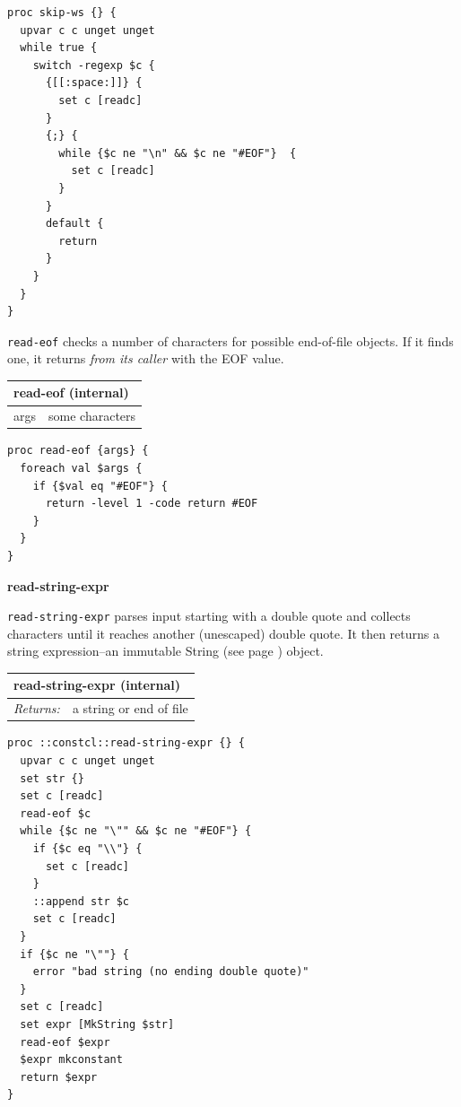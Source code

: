\documentclass[twoside,9pt]{report}
\begin{document}
\noindent\makebox[\linewidth]{\rule{\linewidth}{0.4pt}}
\begin{lstlisting}
proc skip-ws {} {
  upvar c c unget unget
  while true {
    switch -regexp $c {
      {[[:space:]]} {
        set c [readc]
      }
      {;} {
        while {$c ne "\n" && $c ne "#EOF"}  {
          set c [readc]
        }
      }
      default {
        return
      }
    }
  }
}
\end{lstlisting}
\noindent\makebox[\linewidth]{\rule{\linewidth}{0.4pt}}

\texttt{read-eof} checks a number of characters for possible end-of-file objects. If it finds one, it returns \emph{from its caller} with the EOF value.

\begin{tabular}{ |l l| }
\hline
\multicolumn{2}{|l|}{read-eof (internal)} \\
\hline
args & some characters \\
\hline
\end{tabular}

\noindent\makebox[\linewidth]{\rule{\linewidth}{0.4pt}}
\begin{lstlisting}
proc read-eof {args} {
  foreach val $args {
    if {$val eq "#EOF"} {
      return -level 1 -code return #EOF
    }
  }
}
\end{lstlisting}
\noindent\makebox[\linewidth]{\rule{\linewidth}{0.4pt}}

\textbf{read-string-expr}


\texttt{read-string-expr} parses input starting with a double quote and collects characters until it reaches another (unescaped) double quote. It then returns a string expression--an immutable String (see page \pageref{strings}) object.

\begin{tabular}{ |l l| }
\hline
\multicolumn{2}{|l|}{read-string-expr (internal)} \\
\hline
\textit{Returns:} & a string or end of file \\
\hline
\end{tabular}

\noindent\makebox[\linewidth]{\rule{\linewidth}{0.4pt}}
\begin{lstlisting}
proc ::constcl::read-string-expr {} {
  upvar c c unget unget
  set str {}
  set c [readc]
  read-eof $c
  while {$c ne "\"" && $c ne "#EOF"} {
    if {$c eq "\\"} {
      set c [readc]
    }
    ::append str $c
    set c [readc]
  }
  if {$c ne "\""} {
    error "bad string (no ending double quote)"
  }
  set c [readc]
  set expr [MkString $str]
  read-eof $expr
  $expr mkconstant
  return $expr
}
\end{lstlisting}
\noindent\makebox[\linewidth]{\rule{\linewidth}{0.4pt}}
\end{document}
